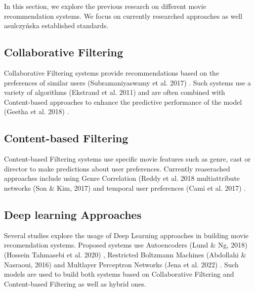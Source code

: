 In this section, we explore the previous research on different movie recommendation systems. We focus on currently researched approaches as well asulczyńska established standards.

\subsection{Collaborative Filtering}

Collaborative Filtering systems provide recommendations based on the preferences of similar users (Subramaniyaswamy et al. 2017) \cite{doi:10.1504/IJHPCN.2017.083199}. Such systems use a variety of algorithms (Ekstrand et al. 2011) \cite{HCI-009} and are often combined with Content-based approaches to enhance the predictive performance of the model (Geetha et al. 2018) \cite{Geetha_2018}.

\subsection{Content-based Filtering}
Content-based Filtering systems use specific movie features such as genre, cast or director to make predictions about user preferences. Currently reaserached approaches include using Genre Correlation (Reddy et al. 2018 \cite{10.1007/978-981-13-1927-3_42} multiattribute networks (Son \& Kim, 2017) \cite{SON2017404} and temporal user preferences (Cami et al. 2017) \cite{8311601}.

\subsection{Deep learning Approaches}
Several studies explore the usage of Deep Learning approaches in building movie recomendation systems. Proposed systems use Autoencoders (Lund \& Ng, 2018) \cite{8424686} (Hossein Tahmasebi et al. 2020) \cite{Tahmasebi2021}, Restricted Boltzmann Machines (Abdollahi \& Nasraoui, 2016) \cite{abdollahi2016explainable} and Multlayer Perceptron Networks (Jena et al. 2022) \cite{Jena2022}. Such models are used to build both systems based on Collaborative Filtering and Content-based Filtering as well as hybrid ones.